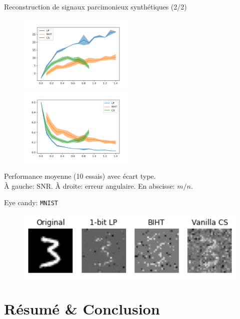 \documentclass[10pt, aspectratio=169]{beamer}
\begin{document}
\begin{frame}{Reconstruction de signaux parcimonieux synthétiques (2/2)}
\begin{figure}
    \includegraphics[width=0.5\textwidth]{figures/summary_snr.png}%
    \includegraphics[width=0.5\textwidth]{figures/summary_angular.png}
\end{figure}    
\centering
Performance moyenne (10 essais) avec écart type. \\À gauche: $\mathrm{SNR}$. À droite: erreur angulaire. En abscisse: $m/n$.
\end{frame}
\begin{frame}{Eye candy: \texttt{MNIST}}
\begin{figure}
    \includegraphics[width=1\textwidth]{figures/mnist.png}%
\end{figure}    
\end{frame}

\section{Résumé \& Conclusion}
\end{document}
